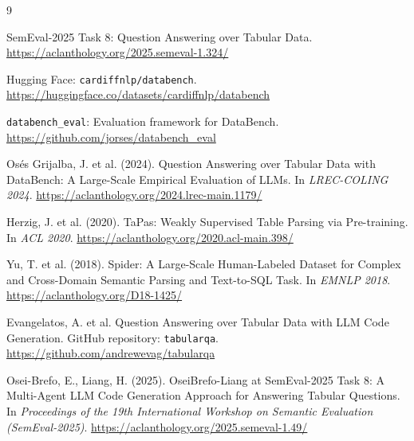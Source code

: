 \documentclass[12pt,a4paper]{article}
\begin{document}

\tableofcontents
\newpage




















\begin{thebibliography}{9}

SemEval-2025 Task 8: Question Answering over Tabular Data.
\newblock \url{https://aclanthology.org/2025.semeval-1.324/}

Hugging Face: \texttt{cardiffnlp/databench}.
\newblock \url{https://huggingface.co/datasets/cardiffnlp/databench}

\texttt{databench\_eval}: Evaluation framework for DataBench.
\newblock \url{https://github.com/jorses/databench_eval}

Osés Grijalba, J. et al. (2024).
Question Answering over Tabular Data with DataBench:
A Large-Scale Empirical Evaluation of LLMs.
In \emph{LREC-COLING 2024}.
\newblock \url{https://aclanthology.org/2024.lrec-main.1179/}

Herzig, J. et al. (2020).
TaPas: Weakly Supervised Table Parsing via Pre-training.
In \emph{ACL 2020}.
\newblock \url{https://aclanthology.org/2020.acl-main.398/}

Yu, T. et al. (2018).
Spider: A Large-Scale Human-Labeled Dataset for Complex
and Cross-Domain Semantic Parsing and Text-to-SQL Task.
In \emph{EMNLP 2018}.
\newblock \url{https://aclanthology.org/D18-1425/}

Evangelatos, A. et al.
Question Answering over Tabular Data with LLM Code Generation.
GitHub repository: \texttt{tabularqa}.
\newblock \url{https://github.com/andrewevag/tabularqa}

Osei-Brefo, E., Liang, H. (2025).
OseiBrefo-Liang at SemEval-2025 Task 8:
A Multi-Agent LLM Code Generation Approach for Answering Tabular Questions.
In \emph{Proceedings of the 19th International Workshop on Semantic Evaluation (SemEval-2025)}.
\newblock \url{https://aclanthology.org/2025.semeval-1.49/}

\end{thebibliography}
\end{document}
